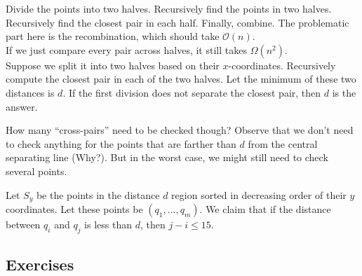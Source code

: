 Divide the points into two halves. Recursively find the points in two halves. Recursively find the closest pair in each half. Finally, combine. The problematic part here is the recombination, which should take $\mathcal{O}(n)$.\\
If we just compare every pair across halves, it still takes $\Omega(n^2)$.\\

Suppose we split it into two halves based on their $x$-coordinates. Recursively compute the closest pair in each of the two halves. Let the minimum of these two distances is $d$. If the first division does not separate the closest pair, then $d$ is the answer.

How many ``cross-pairs'' need to be checked though? Observe that we don't need to check anything for the points that are farther than $d$ from the central separating line (Why?). But in the worst case, we might still need to check several points.

\begin{lemma}
	Let $S_y$ be the points in the distance $d$ region sorted in decreasing order of their $y$ coordinates. Let these points be $(q_1,\ldots,q_m)$. We claim that if the distance between $q_i$ and $q_j$ is less than $d$, then $j-i\leq 15$.
\end{lemma}

\subsection{Exercises}


